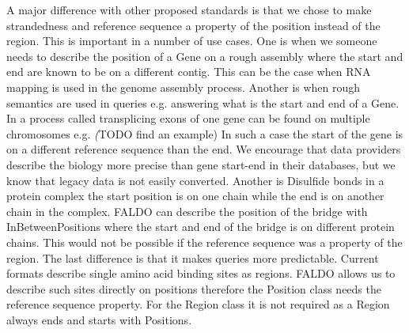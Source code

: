 A major difference with other proposed standards is that we chose to make strandedness and reference sequence a property of the position instead of the region.
This is important in a number of use cases.
One is when we someone needs to describe the position of a Gene on a rough assembly where the start and end are known to be on a different contig. 
This can be the case when RNA mapping is used in the genome assembly process.
Another is when rough semantics are used in queries e.g. answering what is the start and end of a Gene. 
In a process called transplicing exons of one gene can be found on multiple chromosomes e.g. \textit(TODO find an example)
In such a case the start of the gene is on a different reference sequence than the end.
We encourage that data providers describe the biology more precise than gene start-end in their databases, but we know that legacy data is not easily converted.
Another is Disulfide bonds in a protein complex the start position is on one chain while the end is on another chain in the complex.
FALDO can describe the position of the bridge with InBetweenPositions where the start and end of the bridge is on different protein chains.
This would not be possible if the reference sequence was a property of the region. 
The last difference is that it makes queries more predictable. 
Current formats describe single amino acid binding sites as regions.
FALDO allows us to describe such sites directly on positions therefore the Position class needs the reference sequence property.
For the Region class it is not required as a Region always ends and starts with Positions.

